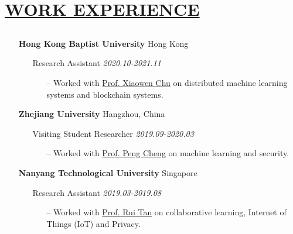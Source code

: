 \documentclass[11pt]{article}
\begin{document}
% 
\section*{\centering\underline{WORK EXPERIENCE}}
\subsection*{}
\begin{itemize}[leftmargin=0em, noitemsep, nolistsep]
    \setlength\itemsep{1em}
    \item[] \large\textbf{Hong Kong Baptist University} \hfill Hong Kong
        \begin{itemize}[noitemsep, nolistsep, leftmargin=0em]
            \item[] {Research Assistant} \hfill \textit{2020.10-2021.11}
             \begin{itemize}
                \small
                \item[--] Worked with \href{https://www.comp.hkbu.edu.hk/~chxw/}{Prof. Xiaowen Chu} on distributed machine learning systems and blockchain systems.
             \end{itemize}
        \end{itemize} 
    \item[] \large\textbf{Zhejiang University} \hfill Hangzhou, China
        \begin{itemize}[noitemsep, nolistsep, leftmargin=0em]
            \item[] {Visiting Student Researcher} \hfill \textit{2019.09-2020.03}
             \begin{itemize}
                \small
                \item[--] Worked with \href{https://person.zju.edu.cn/en/cp}{Prof. Peng Cheng} on machine learning and security.
             \end{itemize}
        \end{itemize} 
    \item[] \large\textbf{Nanyang Technological University} \hfill Singapore
        \begin{itemize}[noitemsep, nolistsep, leftmargin=0em]
            \item[] Research Assistant \hfill \textit{2019.03-2019.08}
             \begin{itemize}
                \small
                \item[--] Worked with \href{https://www.ntu.edu.sg/home/tanrui/}{Prof. Rui Tan} on collaborative learning, Internet of Things (IoT) and Privacy.

\end{itemize}
\end{itemize}
\end{itemize}
\end{document}
